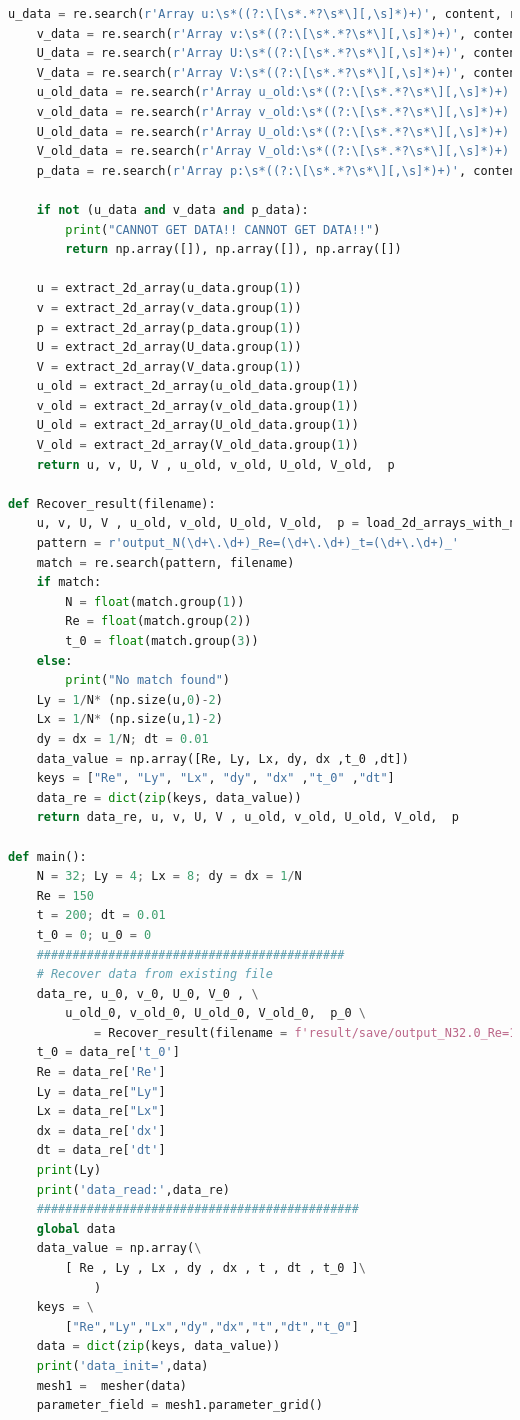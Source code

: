 \documentclass[12pt]{article}
\begin{document}
\begin{scriptsize}
\begin{lstlisting}[language=python,caption={N-S Cylinder Solver}]
    u_data = re.search(r'Array u:\s*((?:\[\s*.*?\s*\][,\s]*)+)', content, re.DOTALL)
    v_data = re.search(r'Array v:\s*((?:\[\s*.*?\s*\][,\s]*)+)', content, re.DOTALL)
    U_data = re.search(r'Array U:\s*((?:\[\s*.*?\s*\][,\s]*)+)', content, re.DOTALL)
    V_data = re.search(r'Array V:\s*((?:\[\s*.*?\s*\][,\s]*)+)', content, re.DOTALL)
    u_old_data = re.search(r'Array u_old:\s*((?:\[\s*.*?\s*\][,\s]*)+)', content, re.DOTALL)
    v_old_data = re.search(r'Array v_old:\s*((?:\[\s*.*?\s*\][,\s]*)+)', content, re.DOTALL)
    U_old_data = re.search(r'Array U_old:\s*((?:\[\s*.*?\s*\][,\s]*)+)', content, re.DOTALL)
    V_old_data = re.search(r'Array V_old:\s*((?:\[\s*.*?\s*\][,\s]*)+)', content, re.DOTALL)
    p_data = re.search(r'Array p:\s*((?:\[\s*.*?\s*\][,\s]*)+)', content, re.DOTALL)

    if not (u_data and v_data and p_data):
        print("CANNOT GET DATA!! CANNOT GET DATA!!")
        return np.array([]), np.array([]), np.array([])

    u = extract_2d_array(u_data.group(1))
    v = extract_2d_array(v_data.group(1))
    p = extract_2d_array(p_data.group(1))
    U = extract_2d_array(U_data.group(1))
    V = extract_2d_array(V_data.group(1))
    u_old = extract_2d_array(u_old_data.group(1))
    v_old = extract_2d_array(v_old_data.group(1))
    U_old = extract_2d_array(U_old_data.group(1))
    V_old = extract_2d_array(V_old_data.group(1))
    return u, v, U, V , u_old, v_old, U_old, V_old,  p

def Recover_result(filename):
    u, v, U, V , u_old, v_old, U_old, V_old,  p = load_2d_arrays_with_numpy(filename)
    pattern = r'output_N(\d+\.\d+)_Re=(\d+\.\d+)_t=(\d+\.\d+)_'
    match = re.search(pattern, filename)
    if match:
        N = float(match.group(1))
        Re = float(match.group(2))
        t_0 = float(match.group(3))
    else:
        print("No match found")
    Ly = 1/N* (np.size(u,0)-2)
    Lx = 1/N* (np.size(u,1)-2)
    dy = dx = 1/N; dt = 0.01
    data_value = np.array([Re, Ly, Lx, dy, dx ,t_0 ,dt])
    keys = ["Re", "Ly", "Lx", "dy", "dx" ,"t_0" ,"dt"]
    data_re = dict(zip(keys, data_value))
    return data_re, u, v, U, V , u_old, v_old, U_old, V_old,  p

def main():    
    N = 32; Ly = 4; Lx = 8; dy = dx = 1/N
    Re = 150
    t = 200; dt = 0.01
    t_0 = 0; u_0 = 0
    ###########################################
    # Recover data from existing file
    data_re, u_0, v_0, U_0, V_0 , \
        u_old_0, v_old_0, U_old_0, V_old_0,  p_0 \
            = Recover_result(filename = f'result/save/output_N32.0_Re=150.0_t=73.0_8.0x4.0222.txt')
    t_0 = data_re['t_0']
    Re = data_re['Re']
    Ly = data_re["Ly"]
    Lx = data_re["Lx"]
    dx = data_re['dx']
    dt = data_re['dt']
    print(Ly)
    print('data_read:',data_re)
    #############################################
    global data
    data_value = np.array(\
        [ Re , Ly , Lx , dy , dx , t , dt , t_0 ]\
            )
    keys = \
        ["Re","Ly","Lx","dy","dx","t","dt","t_0"]
    data = dict(zip(keys, data_value))
    print('data_init=',data)
    mesh1 =  mesher(data)
    parameter_field = mesh1.parameter_grid()


\end{lstlisting}
\end{scriptsize}
\end{document}
